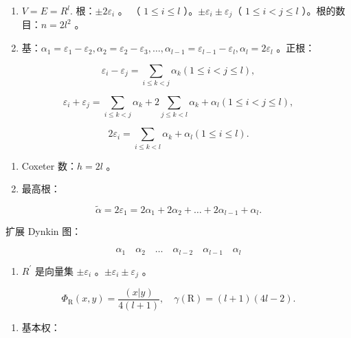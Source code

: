 
\begin{enumerate}
\def\labelenumi{(\Roman{enumi})}
\item
  \(V = E = R^{l}.\) 根：\(\pm2\varepsilon_{i}\) 。 （ \(1\leqslant i\leqslant l\) ）。\(\pm\varepsilon_{i}\pm\varepsilon_{j}\)（ \(1\leqslant i<j\leqslant l\) ）。根的数目：\(n = 2l^{2}\) 。
\item
  基：\(\alpha_{1} = \varepsilon_{1} - \varepsilon_{2},\alpha_{2} = \varepsilon_{2} - \varepsilon_{3},\ldots ,\alpha_{l - 1} = \varepsilon_{l - 1} - \varepsilon_{l},\alpha_{l} = 2\varepsilon_{l}\) 。正根：
\end{enumerate}

\[
\varepsilon_ {i} - \varepsilon_ {j} = \sum_ {i \leqslant k <   j} \alpha_ {k} (1 \leqslant i <   j \leqslant l),
\]

\[
\varepsilon_ {i} + \varepsilon_ {j} = \sum_ {i \leqslant k <   j} \alpha_ {k} + 2 \sum_ {j \leqslant k <   l} \alpha_ {k} + \alpha_ {l} (1 \leqslant i <   j \leqslant l),
\]

\[
2 \varepsilon_ {i} = \sum_ {i \leqslant k <   l} \alpha_ {k} + \alpha_ {l} (1 \leqslant i \leqslant l).
\]

\begin{enumerate}
\def\labelenumi{(\Roman{enumi})}
\setcounter{enumi}{2}
\item
  Coxeter 数：\(h = 2l\) 。
\item
  最高根：
\end{enumerate}

\[
\tilde {\alpha} = 2 \varepsilon_ {1} = 2 \alpha_ {1} + 2 \alpha_ {2} + \dots + 2 \alpha_ {l - 1} + \alpha_ {l}.
\]

扩展 Dynkin 图：

\[
\alpha_ {1} \quad \alpha_ {2} \quad \dots \quad \alpha_ {l - 2} \quad \alpha_ {l - 1} \quad \alpha_ {l}
\]

\begin{enumerate}
\def\labelenumi{(\Alph{enumi})}
\setcounter{enumi}{21}
\tightlist
\item
  \(R^{\prime}\) 是向量集 \(\pm\varepsilon_{i}\) 。\(\pm\varepsilon_{i}\pm\varepsilon_{j}\) 。
\end{enumerate}

\[
\Phi_ {\mathrm{R}} (x, y) = \frac {(x | y)}{4 (l + 1)}, \quad \gamma (\mathrm{R}) = (l + 1) (4 l - 2).
\]

\begin{enumerate}
\def\labelenumi{(\Roman{enumi})}
\setcounter{enumi}{5}
\tightlist
\item
  基本权：
\end{enumerate}

